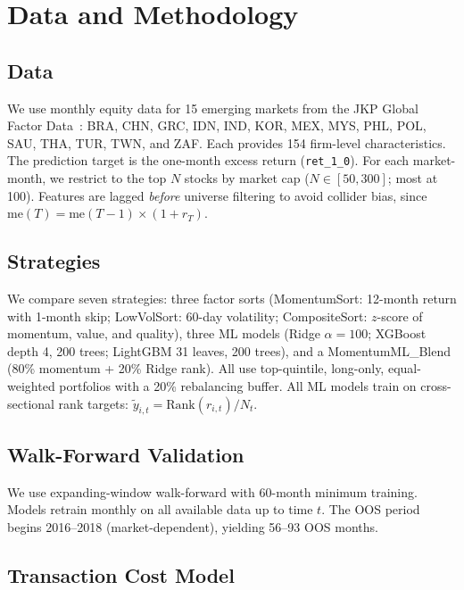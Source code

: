 \documentclass[sigconf,balance=false]{acmart}
\begin{document}
\section{Data and Methodology}

\subsection{Data}

We use monthly equity data for 15 emerging markets from the JKP Global
Factor Data~\cite{JensenKellyPedersen2023}: BRA, CHN, GRC, IDN, IND,
KOR, MEX, MYS, PHL, POL, SAU, THA, TUR, TWN, and ZAF. Each provides
154 firm-level characteristics. The prediction target is the one-month
excess return (\texttt{ret\_1\_0}). For each market-month, we restrict
to the top $N$ stocks by market cap ($N \in [50, 300]$; most at 100).
Features are lagged \emph{before} universe filtering to avoid collider
bias, since $\text{me}(T) = \text{me}(T{-}1) \times (1{+}r_T)$.

\subsection{Strategies}

We compare seven strategies: three factor sorts (MomentumSort: 12-month
return with 1-month skip; LowVolSort: 60-day volatility; CompositeSort:
$z$-score of momentum, value, and quality), three ML models (Ridge
$\alpha{=}100$; XGBoost depth 4, 200 trees; LightGBM 31 leaves, 200
trees), and a MomentumML\_Blend (80\% momentum + 20\% Ridge rank). All
use top-quintile, long-only, equal-weighted portfolios with a 20\%
rebalancing buffer. All ML models train on cross-sectional rank targets:
$\tilde{y}_{i,t} = \text{Rank}(r_{i,t}) / N_t$.

\subsection{Walk-Forward Validation}

We use expanding-window walk-forward with 60-month minimum training.
Models retrain monthly on all available data up to time $t$. The OOS
period begins 2016--2018 (market-dependent), yielding 56--93 OOS months.

\subsection{Transaction Cost Model}
\end{document}
